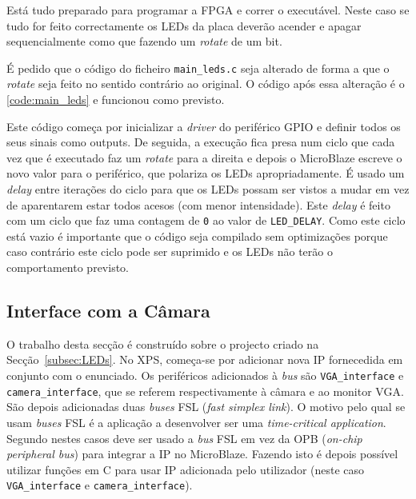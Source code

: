 \documentclass[a4paper,12pt]{article}
\begin{document}
Está tudo preparado para programar a FPGA e correr o executável. Neste caso se tudo for feito correctamente os LEDs da placa deverão acender e apagar sequencialmente como que fazendo um \textit{rotate} de um bit.



É pedido que o código do ficheiro \texttt{main\_leds.c} seja alterado de forma a que o \textit{rotate} seja feito no sentido contrário ao original. O código após essa alteração é o \autoref{code:main_leds} e funcionou como previsto.

Este código começa por inicializar a \textit{driver} do periférico GPIO e definir todos os seus sinais como outputs. De seguida, a execução fica presa num ciclo que cada vez que é executado faz um \textit{rotate} para a direita e depois o MicroBlaze escreve o novo valor para o periférico, que polariza os LEDs apropriadamente. É usado um \textit{delay} entre iterações do ciclo para que os LEDs possam ser vistos a mudar em vez de aparentarem estar todos acesos (com menor intensidade). Este \textit{delay} é feito com um ciclo que faz uma contagem de \texttt{0} ao valor de \texttt{LED\_DELAY}. Como este ciclo está vazio é importante que o código seja compilado sem optimizações porque caso contrário este ciclo pode ser suprimido e os LEDs não terão o comportamento previsto.

\subsection{Interface com a Câmara}

O trabalho desta secção é construído sobre o projecto criado na Secção~\ref{subsec:LEDs}. No XPS, começa-se por adicionar nova IP fornecedida em conjunto com o enunciado. Os periféricos adicionados à \textit{bus} são \texttt{VGA\_interface} e \texttt{camera\_interface}, que se referem respectivamente à câmara e ao monitor VGA. São depois adicionadas duas \textit{buses} FSL (\textit{fast simplex link}). O motivo pelo qual se usam \textit{buses} FSL é a aplicação a desenvolver ser uma \textit{time-critical application}. Segundo \cite{bib:appnoteXilinxFSL} nestes casos deve ser usado a \textit{bus} FSL em vez da OPB (\textit{on-chip peripheral bus}) para integrar a IP no MicroBlaze. Fazendo isto é depois possível utilizar funções em C para usar IP adicionada pelo utilizador (neste caso \texttt{VGA\_interface} e \texttt{camera\_interface}).
\end{document}
